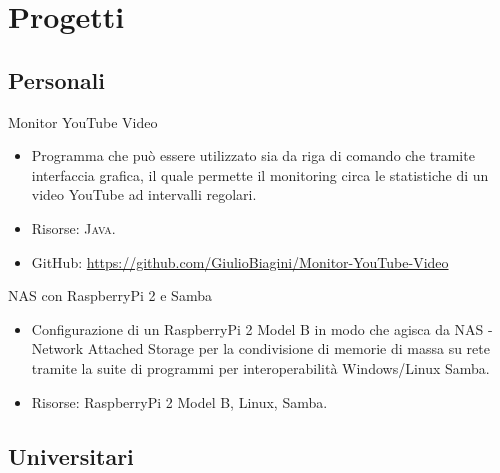 %
%
%
%
%
%



\section{Progetti}

\subsection{Personali}

{Monitor YouTube Video}
{}
{}
{}
{\begin{itemize}
	\item Programma che può essere utilizzato sia da riga di comando che tramite
	interfaccia grafica, il quale permette il monitoring circa le statistiche di
	un video YouTube ad intervalli regolari.
	\item Risorse: \textsc{Java}.
	\item GitHub: \url{https://github.com/GiulioBiagini/Monitor-YouTube-Video}
\end{itemize}}

{NAS con RaspberryPi 2 e Samba}
{}
{}
{}
{\begin{itemize}
	\item Configurazione di un RaspberryPi 2 Model B in modo che agisca da NAS -
	Network Attached Storage per la condivisione di memorie di massa su rete
	tramite la suite di programmi per interoperabilità Windows/Linux Samba.
	\item Risorse: RaspberryPi 2 Model B, Linux, Samba.
\end{itemize}}



\subsection{Universitari}

